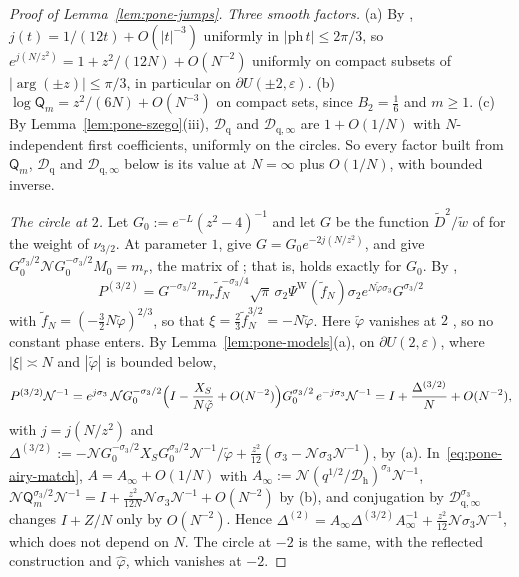 \begin{proof}[Proof of Lemma~\textup{\ref{lem:pone-jumps}}]
\emph{Three smooth factors.} (a) By \cite[(5.11.1), \S5.11(ii)]{DLMF}, $j(t)=1/(12t)+O(|t|^{-3})$ uniformly in
$|\mathrm{ph}\,t|\le2\pi/3$, so $e^{j(N/z^2)}=1+z^2/(12N)+O(N^{-2})$ uniformly on compact subsets of $|\arg(\pm z)|\le\pi/3$, in
particular on $\partial U(\pm2,\varepsilon)$. (b) $\log\mathsf Q_m=z^2/(6N)+O(N^{-3})$ on compact sets, since $B_2=\frac16$ and
$m\ge1$. (c) By Lemma~\ref{lem:pone-szego}(iii), $\mathcal D_{\mathrm q}$ and $\mathcal D_{\mathrm q,\infty}$ are $1+O(1/N)$ with
$N$-independent first coefficients, uniformly on the circles. So every factor built from $\mathsf Q_m$, $\mathcal D_{\mathrm q}$
and $\mathcal D_{\mathrm q,\infty}$ below is its value at $N=\infty$ plus $O(1/N)$, with bounded inverse.

\emph{The circle at $2$.} Let $G_0:=e^{-L}(z^2-4)^{-1}$ and let $G$ be the function $\tilde D^2/\tilde w$ of \cite[(6.12)]{WLXZ}
for the weight of $\nu_{3/2}$. At parameter $1$, \cite[(2.15), (3.4), (3.7), (4.15), (4.24)]{WLXZ} give $G=G_0e^{-2j(N/z^2)}$,
and \cite[(5.11), (6.16)]{WLXZ} give $G_0^{\sigma_3/2}\mathcal NG_0^{-\sigma_3/2}M_0=m_r$, the matrix of \cite[(6.16)]{WLXZ}; that
is, \cite[(6.14)]{WLXZ} holds exactly for $G_0$. By \cite[(6.10), (6.12), (6.15)]{WLXZ},
\[
  P^{(3/2)}=G^{-\sigma_3/2}m_r\tilde f_N^{-\sigma_3/4}\sqrt\pi\,\sigma_2\Psi^{\mathrm W}(\tilde f_N)\sigma_2e^{N\tilde\varphi\sigma_3}G^{\sigma_3/2}
\]
with $\tilde f_N=(-\frac32N\tilde\varphi)^{2/3}$, so that $\xi=\frac23\tilde f_N^{3/2}=-N\tilde\varphi$. Here $\tilde\varphi$ vanishes
at $2$ \cite[(6.11)]{WLXZ}, so no constant phase enters. By Lemma~\ref{lem:pone-models}(a), on $\partial U(2,\varepsilon)$, where
$|\xi|\asymp N$ and $|\tilde\varphi|$ is bounded below,
\[
  P^{(3/2)}\mathcal N^{-1}=e^{j\sigma_3}\,\mathcal NG_0^{-\sigma_3/2}\Bigl(I-\frac{X_S}{N\tilde\varphi}+O(N^{-2})\Bigr)G_0^{\sigma_3/2}\,
  e^{-j\sigma_3}\mathcal N^{-1}=I+\frac{\Delta^{(3/2)}}N+O(N^{-2}),
\]
with $j=j(N/z^2)$ and
$\Delta^{(3/2)}:=-\mathcal NG_0^{-\sigma_3/2}X_SG_0^{\sigma_3/2}\mathcal N^{-1}/\tilde\varphi+\frac{z^2}{12}(\sigma_3-\mathcal N\sigma_3\mathcal N^{-1})$,
by (a). In~\eqref{eq:pone-airy-match}, $A=A_\infty+O(1/N)$ with $A_\infty:=\mathcal N(q^{1/2}/\mathcal D_{\mathrm h})^{\sigma_3}\mathcal N^{-1}$,
$\mathcal N\mathsf Q_m^{\sigma_3/2}\mathcal N^{-1}=I+\frac{z^2}{12N}\mathcal N\sigma_3\mathcal N^{-1}+O(N^{-2})$ by (b), and conjugation by
$\mathcal D_{\mathrm q,\infty}^{\sigma_3}$ changes $I+Z/N$ only by $O(N^{-2})$. Hence
$\Delta^{(2)}=A_\infty\Delta^{(3/2)}A_\infty^{-1}+\frac{z^2}{12}\mathcal N\sigma_3\mathcal N^{-1}$, which does not depend on $N$. The
circle at $-2$ is the same, with the reflected construction \cite[(6.17)--(6.21)]{WLXZ} and $\hat\varphi$, which vanishes
at $-2$.


\end{proof}
